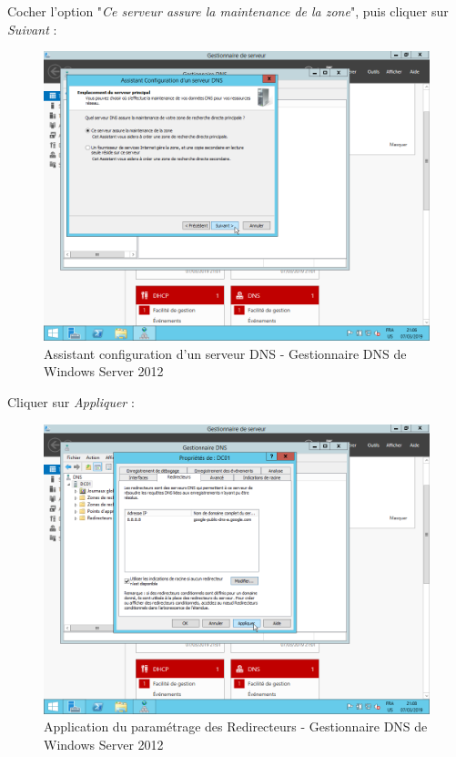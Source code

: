 \newpage
Cocher l'option "\textit{Ce serveur assure la maintenance de la zone}", puis cliquer sur \textit{Suivant} :
\begin{figure}[h!]
    \begin{center}
        \includegraphics[scale=0.6]{WS2012_Screenshots/38.png}
        \caption{Assistant configuration d'un serveur DNS - Gestionnaire DNS de Windows Server 2012}
        \label{WS2012_Screenshots/38}
    \end{center}
\end{figure}
\FloatBarrier

\newpage
Cliquer sur \textit{Appliquer} :
\begin{figure}[h!]
    \begin{center}
        \includegraphics[scale=0.5]{WS2012_Screenshots/39.png}
        \caption{Application du paramétrage des Redirecteurs - Gestionnaire DNS de Windows Server 2012}
        \label{WS2012_Screenshots/39}
    \end{center}
\end{figure}
\FloatBarrier

